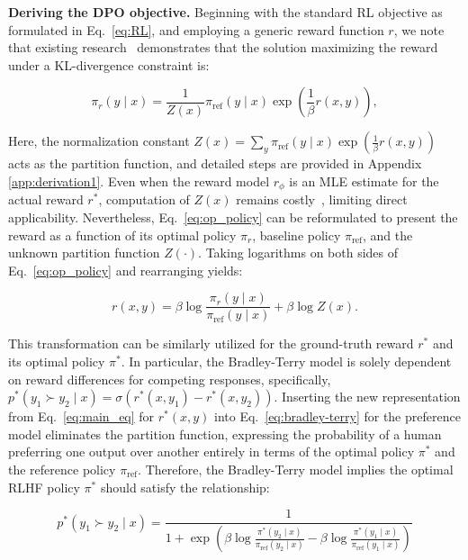 \textbf{Deriving the DPO objective.} Beginning with the standard RL objective as formulated in Eq.~\ref{eq:RL}, and employing a generic reward function $r$, we note that existing research~\citep{peters2007reinforcement, peng2019advantage, korbak2022reinforcement, go2023aligning} demonstrates that the solution maximizing the reward under a KL-divergence constraint is:

\begin{equation}\label{eq:op_policy}
    \pi_r(y\mid x) = \frac{1}{Z(x)}\pi_\text{ref}(y\mid x)\exp\left(\frac{1}{\beta}r(x, y)\right),
\end{equation}

Here, the normalization constant $Z(x) =\sum_{y}\pi_\text{ref}(y\mid x)\exp\left(\frac{1}{\beta}r(x, y)\right)$ acts as the partition function, and detailed steps are provided in Appendix \ref{app:derivation1}. Even when the reward model $r_{\phi}$ is an MLE estimate for the actual reward $r^*$, computation of $Z(x)$ remains costly~\citep{korbak2022reinforcement, go2023aligning}, limiting direct applicability. Nevertheless, Eq.~\ref{eq:op_policy} can be reformulated to present the reward as a function of its optimal policy $\pi_r$, baseline policy $\pi_\text{ref}$, and the unknown partition function $Z(\cdot)$. Taking logarithms on both sides of Eq.~\ref{eq:op_policy} and rearranging yields:

\begin{equation}\label{eq:main_eq}
    r(x,y) =\beta \log \frac{\pi_r(y\mid x)}{\pi_\text{ref}(y\mid x)} + \beta \log Z(x).
\end{equation}

This transformation can be similarly utilized for the ground-truth reward $r^*$ and its optimal policy $\pi^*$. In particular, the Bradley-Terry model is solely dependent on reward differences for competing responses, specifically, ${p^*(y_1 \succ y_2 \mid x) = \sigma(r^*(x, y_1) - r^*(x, y_2))}$. Inserting the new representation from Eq.~\ref{eq:main_eq} for $r^*(x, y)$ into Eq.~\ref{eq:bradley-terry} for the preference model eliminates the partition function, expressing the probability of a human preferring one output over another entirely in terms of the optimal policy $\pi^*$ and the reference policy $\pi_\text{ref}$. Therefore, the Bradley-Terry model implies the optimal RLHF policy $\pi^*$ should satisfy the relationship:

\begin{equation}\label{eq:objective}
    p^*(y_1\succ y_2 \mid x)=\frac{1}{1 + \exp\left(\beta \log \frac{\pi^*(y_2\mid x)}{\pi_\text{ref}(y_2\mid x)} - \beta \log \frac{\pi^*(y_1\mid x)}{\pi_\text{ref}(y_1\mid x)}\right)}
\end{equation}

